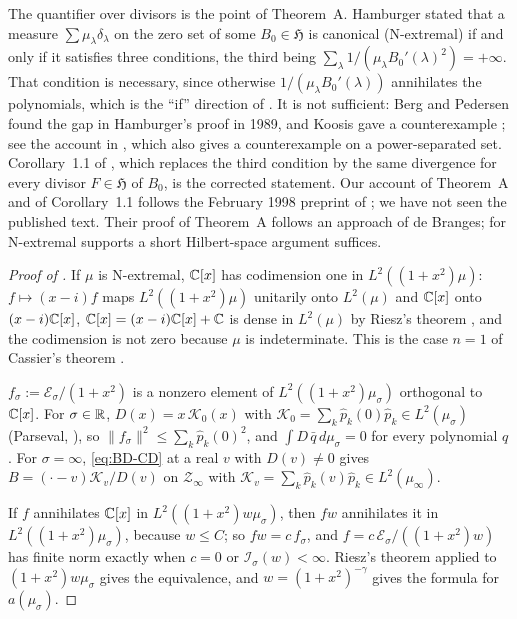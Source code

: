 The quantifier over divisors is the point of Theorem~A. Hamburger \cite{Hamburger1944} stated
that a measure $\sum\mu_\lambda\delta_\lambda$ on the zero set of some $B_0\in\mathfrak H$ is canonical
(N-extremal) if and only if it satisfies three conditions, the third being
$\sum_\lambda1/(\mu_\lambda B_0'(\lambda)^2)=+\infty$. That condition is necessary, since otherwise
$1/(\mu_\lambda B_0'(\lambda))$ annihilates the polynomials, which is the ``if'' direction of
. It is not sufficient: Berg and Pedersen found the gap in Hamburger's proof
in 1989, and Koosis gave a counterexample \cite{Koosis1990}; see the account in
\cite[\S3.5]{AbakumovBaranovBelov2014}, which also gives a counterexample on a power-separated set.
Corollary~1.1 of \cite{BorichevSodin1998}, which replaces the third condition by the same divergence
for every divisor $F\in\mathfrak H$ of $B_0$, is the corrected statement. Our account of Theorem~A and of
Corollary~1.1 follows the February 1998 preprint of \cite{BorichevSodin1998}; we have not seen the
published text. Their proof of Theorem~A follows an approach of de Branges; for N-extremal supports a
short Hilbert-space argument suffices.

\begin{proof}[Proof of ]
 If $\mu$ is N-extremal, $\mathbb{C}[x]$ has codimension one in
$L^2((1+x^2)\mu)$: $f\mapsto(x-i)f$ maps $L^2((1+x^2)\mu)$ unitarily onto $L^2(\mu)$ and $\mathbb{C}[x]$
onto $(x-i)\mathbb{C}[x]$, $\mathbb{C}[x]=(x-i)\mathbb{C}[x]+\mathbb{C}$ is dense in $L^2(\mu)$ by Riesz's theorem
\cite[Thm.~1.3]{BergSzwarc2026}, and the codimension is not zero because $\mu$ is indeterminate.
This is the case $n=1$ of Cassier's theorem \cite[Thm.~2.2]{Berg1996}.

 $f_\sigma:=\mathcal E_\sigma/(1+x^2)$ is a nonzero element of $L^2((1+x^2)\mu_\sigma)$
orthogonal to $\mathbb{C}[x]$. For $\sigma\in\mathbb{R}$, $D(x)=x\,\mathcal K_0(x)$ with $\mathcal K_0=\sum_k\hat p_k(0)\hat p_k\in L^2(\mu_\sigma)$
(Parseval, \cite[(5)--(6)]{BergSzwarcII}), so $\|f_\sigma\|^2\le\sum_k\hat p_k(0)^2$, and
$\int D\,\bar q\,d\mu_\sigma=0$ for every polynomial $q$ \cite[Prop.~3.1(i)]{BergSzwarcII}. For
$\sigma=\infty$, \eqref{eq:BD-CD} at a real $v$ with $D(v)\ne0$ gives $B=(\cdot-v)\mathcal K_v/D(v)$ on
$\mathcal Z_\infty$ with $\mathcal K_v=\sum_k\hat p_k(v)\hat p_k\in L^2(\mu_\infty)$.

 If $f$ annihilates $\mathbb{C}[x]$ in $L^2((1+x^2)w\mu_\sigma)$, then $fw$ annihilates
it in $L^2((1+x^2)\mu_\sigma)$, because $w\le C$; so $fw=c\,f_\sigma$, and $f=c\,\mathcal E_\sigma/((1+x^2)w)$ has
finite norm exactly when $c=0$ or $\mathcal I_\sigma(w)<\infty$. Riesz's theorem applied to $(1+x^2)w\mu_\sigma$
gives the equivalence, and $w=(1+x^2)^{-\gamma}$ gives the formula for $a(\mu_\sigma)$.
\end{proof}

